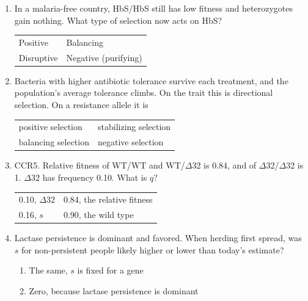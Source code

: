 \documentclass[11pt]{article}
\newcommand{\work}[1]{\par\vspace{#1}}
\begin{document}
\begin{enumerate}[label=\textbf{\arabic*.}, leftmargin=2em, itemsep=1.4em]
\item In a malaria-free country, HbS/HbS still has low fitness and heterozygotes gain nothing. What type of selection now acts on HbS?
\par\smallskip\noindent\begin{tabularx}{\linewidth}{@{}YY@{}}
Positive & Balancing \\[3pt]
Disruptive & Negative (purifying) \\
\end{tabularx}
\item Bacteria with higher antibiotic tolerance survive each treatment, and the population's average tolerance climbs. On the trait this is directional selection. On a resistance allele it is
\par\smallskip\noindent\begin{tabularx}{\linewidth}{@{}YY@{}}
positive selection & stabilizing selection \\[3pt]
balancing selection & negative selection \\
\end{tabularx}
\item CCR5. Relative fitness of WT/WT and WT/\(\Delta\)32 is 0.84, and of \(\Delta\)32/\(\Delta\)32 is 1. \(\Delta\)32 has frequency 0.10. What is \(q\)?
\par\smallskip\noindent\begin{tabularx}{\linewidth}{@{}YY@{}}
0.10, \(\Delta\)32 & 0.84, the relative fitness \\[3pt]
0.16, \(s\) & 0.90, the wild type \\
\end{tabularx}
\work{1.6cm}
\item Lactase persistence is dominant and favored. When herding first spread, was \(s\) for non-persistent people likely higher or lower than today's estimate?
\par\smallskip
\begin{enumerate}[label={}, leftmargin=2.4em, labelwidth=0pt, itemsep=2pt, topsep=0pt]
\item \hspace*{-2.4em}The same, \(s\) is fixed for a gene
\item \hspace*{-2.4em}Zero, because lactase persistence is dominant

\end{enumerate}
\end{enumerate}
\end{document}

